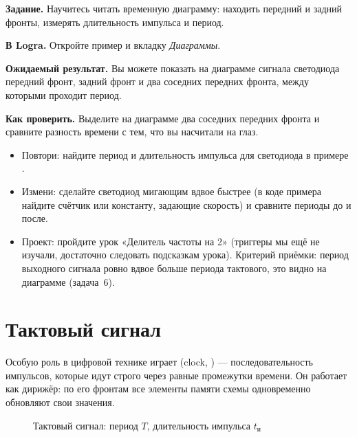 \begin{diybox}
\textbf{Задание.} Научитесь читать временную диаграмму: находить передний и
задний фронты, измерять длительность импульса и период.\par
\textbf{В Logra.} Откройте пример  и вкладку
\emph{Диаграммы}.\par
\textbf{Ожидаемый результат.} Вы можете показать на диаграмме
сигнала светодиода передний фронт, задний фронт и два соседних передних
фронта, между которыми проходит период.\par
\textbf{Как проверить.} Выделите на диаграмме два соседних передних фронта
и сравните разность времени с тем, что вы насчитали на глаз.
\begin{itemize}[leftmargin=3.4em,labelwidth=3em,labelsep=0.4em,align=left]
  \item[\stars{1}] Повтори: найдите период и длительность импульса для
    светодиода в примере .
  \item[\stars{2}] Измени: сделайте светодиод мигающим вдвое быстрее
    (в коде примера найдите счётчик или константу, задающие скорость) и
    сравните периоды до и после.
  \item[\stars{3}] Проект: пройдите урок «Делитель частоты на 2» (триггеры
    мы ещё не изучали, достаточно следовать подсказкам урока). Критерий
    приёмки: период выходного сигнала ровно вдвое больше периода тактового,
    это видно на диаграмме (задача~6).
\end{itemize}
\end{diybox}

\section{Тактовый сигнал}

Особую роль в цифровой технике играет  (clock, ) ---
последовательность импульсов, которые идут строго через равные промежутки
времени. Он работает как дирижёр: по его фронтам все элементы памяти схемы
одновременно обновляют свои значения.

\begin{figure}[H]
\centering
{}
\caption{Тактовый сигнал: период $T$, длительность импульса $t_\text{и}$}
\end{figure}

